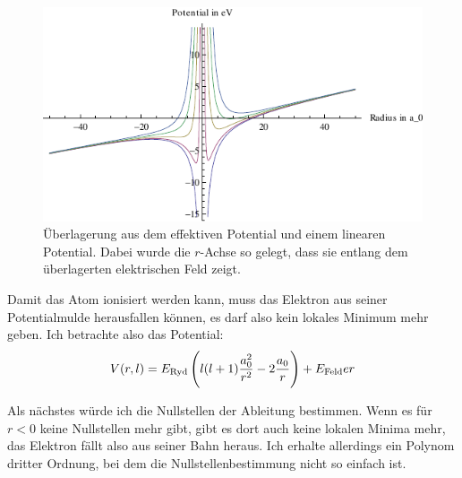 \begin{figure}
	\centering
	\includegraphics[width=\textwidth]{3-Ueberlagerung.pdf}
	\caption{%
		Überlagerung aus dem effektiven Potential und einem linearen Potential.
		Dabei wurde die $r$-Achse so gelegt, dass sie entlang dem überlagerten
		elektrischen Feld zeigt.
	}
	\label{fig:3}
\end{figure}

Damit das Atom ionisiert werden kann, muss das Elektron aus seiner
Potentialmulde herausfallen können, es darf also kein lokales Minimum mehr
geben. Ich betrachte also das Potential:
\[
	V(r, l) = E_\text{Ryd} \del{l(l+1) \frac{a_0^2}{r^2} - 2 \frac{a_0}r} + E_\text{Feld} e r
\]

Als nächstes würde ich die Nullstellen der Ableitung bestimmen. Wenn es für $r
< 0$ keine Nullstellen mehr gibt, gibt es dort auch keine lokalen Minima mehr,
das Elektron fällt also aus seiner Bahn heraus. Ich erhalte allerdings ein Polynom dritter Ordnung, bei dem die Nullstellenbestimmung nicht so einfach ist.


\IfFileExists{\bibliographyfile}{
}{}



